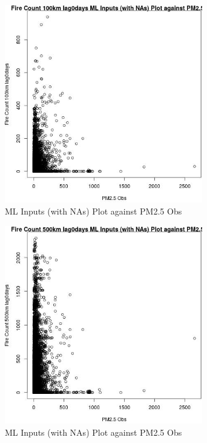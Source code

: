 \begin{figure} 
\centering  
\includegraphics[width=0.77\textwidth]{Code_Outputs/Report_ML_input_PM25_Step4_part_e_de_duplicated_aves_compiled_2019-05-21wNAs_Fire_Count_100km_lag0daysvPM25_Obs.jpg} 
\caption{\label{fig:Report_ML_input_PM25_Step4_part_e_de_duplicated_aves_compiled_2019-05-21wNAsFire_Count_100km_lag0daysvPM25_Obs}ML Inputs (with NAs) Plot against PM2.5 Obs} 
\end{figure} 
 

\begin{figure} 
\centering  
\includegraphics[width=0.77\textwidth]{Code_Outputs/Report_ML_input_PM25_Step4_part_e_de_duplicated_aves_compiled_2019-05-21wNAs_Fire_Count_500km_lag0daysvPM25_Obs.jpg} 
\caption{\label{fig:Report_ML_input_PM25_Step4_part_e_de_duplicated_aves_compiled_2019-05-21wNAsFire_Count_500km_lag0daysvPM25_Obs}ML Inputs (with NAs) Plot against PM2.5 Obs} 
\end{figure} 
 

